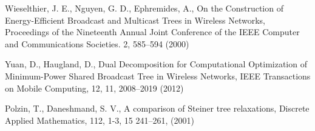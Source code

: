 \begin{thebibliography}{}
%
%
Wieselthier,  J. E., Nguyen, G. D., Ephremides, A.,
On the Construction of Energy-Efficient Broadcast and Multicast Trees in Wireless Networks,
Proceedings of the Nineteenth Annual Joint Conference of the IEEE Computer and Communications Societies.
2, 585--594 (2000)

Yuan, D., Haugland, D.,
Dual Decomposition for Computational Optimization of Minimum-Power Shared Broadcast Tree in Wireless Networks,
IEEE Transactions on Mobile Computing,
12, 11, 2008--2019 (2012)

Polzin, T., Daneshmand, S. V., A comparison of Steiner tree relaxations, Discrete Applied Mathematics, 112,  1-3, 15 241--261, (2001)
\end{thebibliography}



